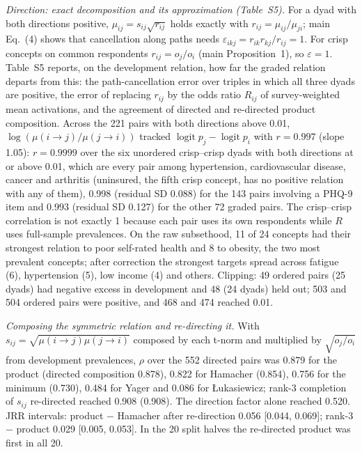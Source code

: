 \documentclass[journal]{IEEEtran}
\begin{document}
\emph{Direction: exact decomposition and its approximation (Table~S5).} For a dyad with both directions positive, $\mu_{ij}=s_{ij}\sqrt{r_{ij}}$ holds exactly with $r_{ij}=\mu_{ij}/\mu_{ji}$; main Eq.~(4) shows that cancellation along paths needs $\varepsilon_{ikj}=r_{ik}r_{kj}/r_{ij}=1$. For crisp concepts on common respondents $r_{ij}=o_j/o_i$ (main Proposition~1), so $\varepsilon=1$. Table~S5 reports, on the development relation, how far the graded relation departs from this: the path-cancellation error over triples in which all three dyads are positive, the error of replacing $r_{ij}$ by the odds ratio $R_{ij}$ of survey-weighted mean activations, and the agreement of directed and re-directed product composition. Across the 221 pairs with both directions above 0.01, $\log(\mu(i\to j)/\mu(j\to i))$ tracked $\operatorname{logit}p_j-\operatorname{logit}p_i$ with $r=0.997$ (slope 1.05): $r=0.9999$ over the six unordered crisp--crisp dyads with both directions at or above 0.01, which are every pair among hypertension, cardiovascular disease, cancer and arthritis (uninsured, the fifth crisp concept, has no positive relation with any of them), 0.998 (residual SD 0.088) for the 143 pairs involving a PHQ-9 item and 0.993 (residual SD 0.127) for the other 72 graded pairs. The crisp--crisp correlation is not exactly 1 because each pair uses its own respondents while $R$ uses full-sample prevalences. On the raw subsethood, 11 of 24 concepts had their strongest relation to poor self-rated health and 8 to obesity, the two most prevalent concepts; after correction the strongest targets spread across fatigue (6), hypertension (5), low income (4) and others. Clipping: 49 ordered pairs (25 dyads) had negative excess in development and 48 (24 dyads) held out; 503 and 504 ordered pairs were positive, and 468 and 474 reached 0.01.

\emph{Composing the symmetric relation and re-directing it.} With $s_{ij}=\sqrt{\mu(i\to j)\mu(j\to i)}$ composed by each t-norm and multiplied by $\sqrt{o_j/o_i}$ from development prevalences, $\rho$ over the 552 directed pairs was 0.879 for the product (directed composition 0.878), 0.822 for Hamacher (0.854), 0.756 for the minimum (0.730), 0.484 for Yager and 0.086 for {\L}ukasiewicz; rank-3 completion of $s_{ij}$ re-directed reached 0.908 (0.908). The direction factor alone reached 0.520. JRR intervals: product $-$ Hamacher after re-direction 0.056 [0.044, 0.069]; rank-3 $-$ product 0.029 [0.005, 0.053]. In the 20 split halves the re-directed product was first in all 20.
\end{document}
